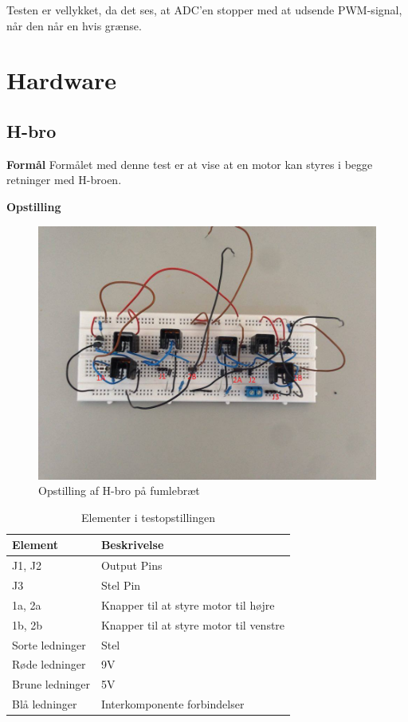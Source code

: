 Testen er vellykket, da det ses, at ADC'en stopper med at udsende PWM-signal, når den når en hvis grænse. 

\section{Hardware}
\subsection{H-bro}
\textbf{Formål} \newline
Formålet med denne test er at vise at en motor kan styres i begge retninger med H-broen.\newline

\noindent \textbf{Opstilling}

\begin{figure}[H]
	\centering
	\includegraphics[width=\textwidth]{test/images/testhbroopst}
	\caption{Opstilling af H-bro på fumlebræt}
\end{figure}

\begin{table}[H]
	\centering
	\label{hbro}
	\begin{tabular}{|l|l|}
		\hline
		\textbf{Element} & \textbf{Beskrivelse}                   \\ \hline
		J1, J2           & Output Pins                            \\ \hline
		J3               & Stel Pin                               \\ \hline
		1a, 2a           & Knapper til at styre motor til højre   \\ \hline
		1b, 2b           & Knapper til at styre motor til venstre \\ \hline
		Sorte ledninger  & Stel                                   \\ \hline
		Røde ledninger   & 9V                                     \\ \hline
		Brune ledninger  & 5V                                     \\ \hline
		Blå ledninger    & Interkomponente forbindelser           \\ \hline
	\end{tabular}
	\caption{Elementer i testopstillingen}
\end{table}

